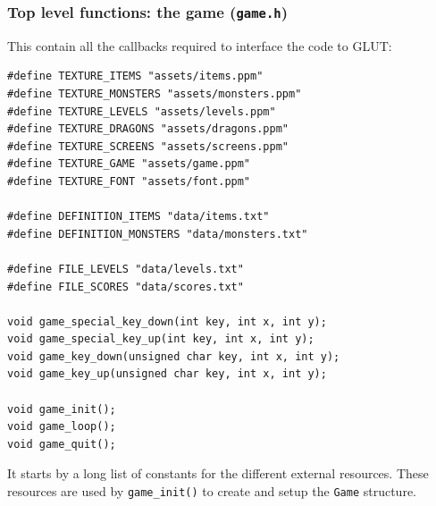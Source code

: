 \documentclass[12pt,a4paper]{article}
\newcommand{\cc}[1]{\texttt{#1}}
\begin{document}
\subsubsection{Top level functions: the game (\texttt{game.h})}

This contain all the callbacks required to interface the code to GLUT:\begin{verbatim}
#define TEXTURE_ITEMS "assets/items.ppm"
#define TEXTURE_MONSTERS "assets/monsters.ppm"
#define TEXTURE_LEVELS "assets/levels.ppm"
#define TEXTURE_DRAGONS "assets/dragons.ppm"
#define TEXTURE_SCREENS "assets/screens.ppm"
#define TEXTURE_GAME "assets/game.ppm"
#define TEXTURE_FONT "assets/font.ppm"

#define DEFINITION_ITEMS "data/items.txt"
#define DEFINITION_MONSTERS "data/monsters.txt"

#define FILE_LEVELS "data/levels.txt"
#define FILE_SCORES "data/scores.txt"

void game_special_key_down(int key, int x, int y);
void game_special_key_up(int key, int x, int y);
void game_key_down(unsigned char key, int x, int y);
void game_key_up(unsigned char key, int x, int y);

void game_init();
void game_loop();
void game_quit();
\end{verbatim}

It starts by a long list of constants for the different external resources. These resources are used by \cc{game_init()} to create and setup the \cc{Game} structure.
\end{document}
